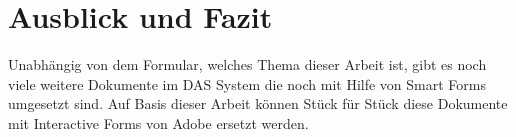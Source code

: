 \chapter{Ausblick und Fazit}

Unabhängig von dem Formular, welches Thema dieser Arbeit ist, gibt es noch viele weitere Dokumente im DAS System die noch mit Hilfe von Smart Forms umgesetzt sind. Auf Basis dieser Arbeit können Stück für Stück diese Dokumente mit Interactive Forms von Adobe ersetzt werden. 